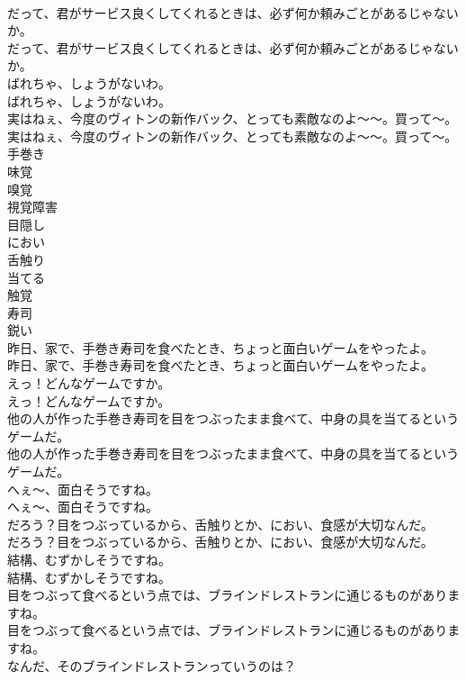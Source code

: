 \documentclass[8pt]{extreport}
\begin{document}
\begin{CJK}{UTF8}{min}
\\	だって、君がサービス良くしてくれるときは、必ず何か頼みごとがあるじゃないか。	
\\	だって、君がサービス良くしてくれるときは、必ず何か頼みごとがあるじゃないか。 
\\	ばれちゃ、しょうがないわ。	
\\	ばれちゃ、しょうがないわ。 
\\	実はねぇ、今度のヴィトンの新作バック、とっても素敵なのよ～～。買って～。	
\\	実はねぇ、今度のヴィトンの新作バック、とっても素敵なのよ～～。買って～。 
\\	手巻き
\\	味覚
\\	嗅覚
\\	視覚障害
\\	目隠し
\\	におい
\\	舌触り
\\	当てる
\\	触覚
\\	寿司
\\	鋭い
\\	昨日、家で、手巻き寿司を食べたとき、ちょっと面白いゲームをやったよ。	
\\	昨日、家で、手巻き寿司を食べたとき、ちょっと面白いゲームをやったよ。 
\\	えっ！どんなゲームですか。	
\\	えっ！どんなゲームですか。 
\\	他の人が作った手巻き寿司を目をつぶったまま食べて、中身の具を当てるというゲームだ。	
\\	他の人が作った手巻き寿司を目をつぶったまま食べて、中身の具を当てるというゲームだ。 
\\	へぇ～、面白そうですね。	
\\	へぇ～、面白そうですね。 
\\	だろう？目をつぶっているから、舌触りとか、におい、食感が大切なんだ。	
\\	だろう？目をつぶっているから、舌触りとか、におい、食感が大切なんだ。 
\\	結構、むずかしそうですね。	
\\	結構、むずかしそうですね。 
\\	目をつぶって食べるという点では、ブラインドレストランに通じるものがありますね。	
\\	目をつぶって食べるという点では、ブラインドレストランに通じるものがありますね。 
\\	なんだ、そのブラインドレストランっていうのは？	

\end{CJK}
\end{document}

